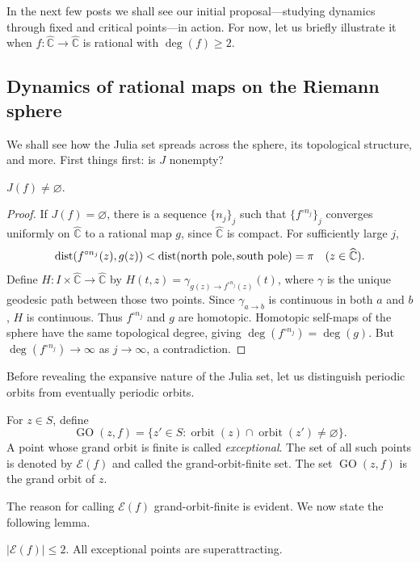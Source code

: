 \documentclass[11pt,a4paper]{article}
\begin{document}
In the next few posts we shall see our initial proposal---studying dynamics through fixed and critical points---in action. For now, let us briefly illustrate it when $f\colon\widehat{\mathbb C}\to\widehat{\mathbb C}$ is rational with $\deg(f)\ge2$.
\subsection{Dynamics of rational maps on the Riemann sphere}
We shall see how the Julia set spreads across the sphere, its topological structure, and more.
First things first: is $J$ nonempty?
\setcounter{theorem}{5}\begin{proposition}[Nonemptiness]\label{cd1:nonempty}
$J(f)\ne\varnothing$.
\end{proposition}
\begin{proof}
If $J(f)=\varnothing$, there is a sequence $\{n_j\}_j$ such that $\{f^{\circ n_j}\}_j$ converges uniformly on $\widehat{\mathbb C}$ to a rational map $g$, since $\widehat{\mathbb C}$ is compact. For sufficiently large $j$,
\[
\operatorname{dist}(f^{\circ n_j}(z),g(z))<\operatorname{dist}(\text{north pole},\text{south pole})=\pi
\quad(z\in\widehat{\mathbb C}).
\]
Define $H\colon I\times\widehat{\mathbb C}\to\widehat{\mathbb C}$ by
$H(t,z)=\gamma_{g(z)\to f^{\circ n_j}(z)}(t)$, where $\gamma$ is the unique geodesic path between those two points. Since $\gamma_{a\to b}$ is continuous in both $a$ and $b$, $H$ is continuous. Thus $f^{\circ n_j}$ and $g$ are homotopic. Homotopic self-maps of the sphere have the same topological degree, giving $\deg(f^{\circ n_j})=\deg(g)$. But $\deg(f^{\circ n_j})\to\infty$ as $j\to\infty$, a contradiction.
\end{proof}
Before revealing the expansive nature of the Julia set, let us distinguish periodic orbits from eventually periodic orbits.
\setcounter{definition}{5}\begin{definition}
For $z\in S$, define
\[
\operatorname{GO}(z,f)=\{z'\in S:\operatorname{orbit}(z)\cap\operatorname{orbit}(z')\ne\varnothing\}.
\]
A point whose grand orbit is finite is called \emph{exceptional}.
The set of all such points is denoted by $\mathcal E(f)$ and called the grand-orbit-finite set. The set $\operatorname{GO}(z,f)$ is the grand orbit of $z$.
\end{definition}
The reason for calling $\mathcal E(f)$ grand-orbit-finite is evident. We now state the following lemma.
\setcounter{theorem}{6}\begin{lemma}\label{cd1:exceptional}
$|\mathcal E(f)|\le2$. All exceptional points are superattracting.
\end{lemma}
\end{document}
